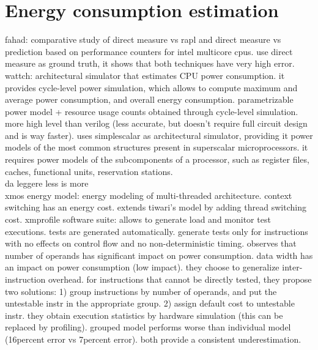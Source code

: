 \section{Energy consumption estimation}
fahad: comparative study of direct measure vs rapl and direct measure vs prediction based on performance counters for intel multicore cpus.
use direct measure as ground truth, it shows that both techniques have very high error.
\newline \newline
wattch: architectural simulator that estimates CPU power consumption.
it provides cycle-level power simulation, which allows to compute maximum and average power consumption, and overall energy consumption.
parametrizable power model + resource usage counts obtained through cycle-level simulation. more high level than verilog (less accurate, but doesn't require full circuit design and is way faster). uses simplescalar as architectural simulator, providing it power models of the most common structures present in superscalar microprocessors.
it requires power models of the subcomponents of a processor, such as register files, caches, functional units, reservation stations. \\[1in]

da leggere less is more\\
xmos energy model: energy modeling of multi-threaded architecture. context switching has an energy cost. extends tiwari's model by adding thread switching cost. xmprofile software suite: allows to generate load and monitor test executions. tests are generated automatically. generate tests only for instructions with no effects on control flow and no non-deterministic timing.
observes that number of operands has significant impact on power consumption. data width has an impact on power consumption (low impact). they choose to generalize inter-instruction overhead. 
for instructions that cannot be directly tested, they propose two solutions: 1) group instructions by number of operands, and put the untestable instr in the appropriate group. 2) assign default cost to untestable instr. 
they obtain execution statistics by hardware simulation (this can be replaced by profiling).
grouped model performs worse than individual model (16percent error vs 7percent error). both provide a consistent underestimation. \\[1in]


